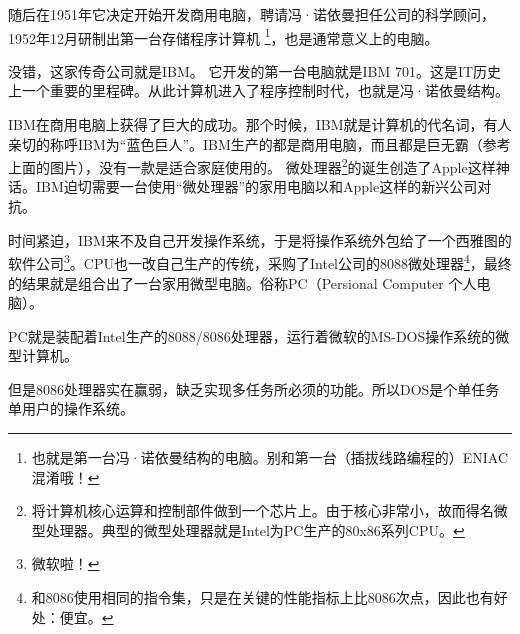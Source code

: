 
随后在1951年它决定开始开发商用电脑，聘请冯·诺依曼担任公司的科学顾问，1952年12月研制出第一台存储程序计算机
\footnote{也就是第一台冯·诺依曼结构的电脑。别和第一台（插拔线路编程的）ENIAC混淆哦！}，也是通常意义上的电脑。

没错，这家传奇公司就是IBM。
它开发的第一台电脑就是IBM 701。这是IT历史上一个重要的里程碑。从此计算机进入了程序控制时代，也就是冯·诺依曼结构。

IBM在商用电脑上获得了巨大的成功。那个时候，IBM就是计算机的代名词，有人亲切的称呼IBM为“蓝色巨人”。IBM生产的都是商用电脑，而且都是巨无霸（参考上面的图片），没有一款是适合家庭使用的。
微处理器\footnote{将计算机核心运算和控制部件做到一个芯片上。由于核心非常小，故而得名微型处理器。典型的微型处理器就是Intel为PC生产的80x86系列CPU。}的诞生创造了Apple这样神话。IBM迫切需要一台使用“微处理器”的家用电脑以和Apple这样的新兴公司对抗。

时间紧迫，IBM来不及自己开发操作系统，于是将操作系统外包给了一个西雅图的软件公司\footnote{微软啦！}。CPU也一改自己生产的传统，采购了Intel公司的8088微处理器\footnote{和8086使用相同的指令集，只是在关键的性能指标上比8086次点，因此也有好处：便宜。}，最终的结果就是组合出了一台家用微型电脑。俗称PC（Persional Computer 个人电脑）。

PC就是装配着Intel生产的8088/8086处理器，运行着微软的MS-DOS操作系统的微型计算机。

但是8086处理器实在赢弱，缺乏实现多任务所必须的功能。所以DOS是个单任务单用户的操作系统。

